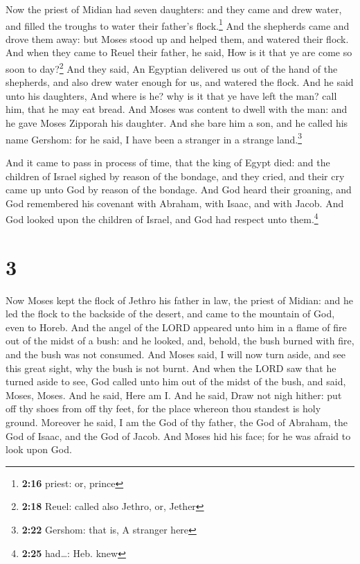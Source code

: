  Now the priest of Midian had seven daughters: and they
came and drew water, and filled the troughs to water their father's
flock.\footnote{\textbf{2:16} priest: or, prince}  And
the shepherds came and drove them away: but Moses stood up and helped
them, and watered their flock.  And when they came to
Reuel their father, he said, How is it that ye are come so soon to
day?\footnote{\textbf{2:18} Reuel: called also Jethro, or, Jether}
 And they said, An Egyptian delivered us out of the hand
of the shepherds, and also drew water enough for us, and watered the
flock.  And he said unto his daughters, And where is he?
why is it that ye have left the man? call him, that he may eat bread.
 And Moses was content to dwell with the man: and he gave
Moses Zipporah his daughter.  And she bare him a son, and
he called his name Gershom: for he said, I have been a stranger in a
strange land.\footnote{\textbf{2:22} Gershom: that is, A stranger here}

 And it came to pass in process of time, that the king of
Egypt died: and the children of Israel sighed by reason of the bondage,
and they cried, and their cry came up unto God by reason of the bondage.
 And God heard their groaning, and God remembered his
covenant with Abraham, with Isaac, and with Jacob.  And
God looked upon the children of Israel, and God had respect unto
them.\footnote{\textbf{2:25} had\ldots: Heb. knew}

\hypertarget{section-2}{%
\section{3}\label{section-2}}

 Now Moses kept the flock of Jethro his father in law, the
priest of Midian: and he led the flock to the backside of the desert,
and came to the mountain of God, even to Horeb.  And the
angel of the LORD appeared unto him in a flame of fire out of the midst
of a bush: and he looked, and, behold, the bush burned with fire, and
the bush was not consumed.  And Moses said, I will now
turn aside, and see this great sight, why the bush is not burnt.
 And when the LORD saw that he turned aside to see, God
called unto him out of the midst of the bush, and said, Moses, Moses.
And he said, Here am I.  And he said, Draw not nigh
hither: put off thy shoes from off thy feet, for the place whereon thou
standest is holy ground.  Moreover he said, I am the God
of thy father, the God of Abraham, the God of Isaac, and the God of
Jacob. And Moses hid his face; for he was afraid to look upon God.

